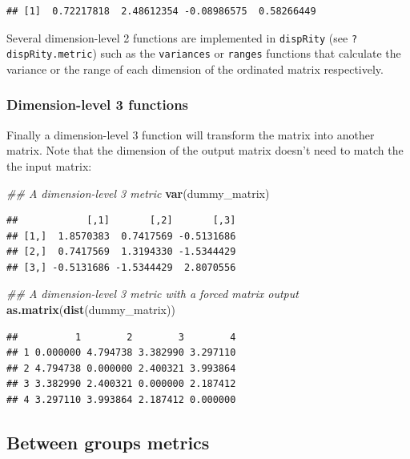 \documentclass[
]{book}
\newenvironment{Shaded}{\begin{snugshade}}{\end{snugshade}}
\newcommand{\CommentTok}[1]{\textcolor[rgb]{0.56,0.35,0.01}{\textit{#1}}}
\newcommand{\KeywordTok}[1]{\textcolor[rgb]{0.13,0.29,0.53}{\textbf{#1}}}
\newcommand{\NormalTok}[1]{#1}
\begin{document}
\begin{verbatim}
## [1]  0.72217818  2.48612354 -0.08986575  0.58266449
\end{verbatim}

Several dimension-level 2 functions are implemented in \texttt{dispRity} (see \texttt{?dispRity.metric}) such as the \texttt{variances} or \texttt{ranges} functions that calculate the variance or the range of each dimension of the ordinated matrix respectively.

\hypertarget{dimension-level-3-functions}{%
\subsubsection{Dimension-level 3 functions}\label{dimension-level-3-functions}}

Finally a dimension-level 3 function will transform the matrix into another matrix.
Note that the dimension of the output matrix doesn't need to match the the input matrix:

\begin{Shaded}
\begin{Highlighting}[]
\CommentTok{\#\# A dimension{-}level 3 metric}
\KeywordTok{var}\NormalTok{(dummy\_matrix)}
\end{Highlighting}
\end{Shaded}

\begin{verbatim}
##            [,1]       [,2]       [,3]
## [1,]  1.8570383  0.7417569 -0.5131686
## [2,]  0.7417569  1.3194330 -1.5344429
## [3,] -0.5131686 -1.5344429  2.8070556
\end{verbatim}

\begin{Shaded}
\begin{Highlighting}[]
\CommentTok{\#\# A dimension{-}level 3 metric with a forced matrix output}
\KeywordTok{as.matrix}\NormalTok{(}\KeywordTok{dist}\NormalTok{(dummy\_matrix))}
\end{Highlighting}
\end{Shaded}

\begin{verbatim}
##          1        2        3        4
## 1 0.000000 4.794738 3.382990 3.297110
## 2 4.794738 0.000000 2.400321 3.993864
## 3 3.382990 2.400321 0.000000 2.187412
## 4 3.297110 3.993864 2.187412 0.000000
\end{verbatim}

\hypertarget{betweengroupmetricsexplain}{%
\subsection{Between groups metrics}\label{betweengroupmetricsexplain}}
\end{document}
